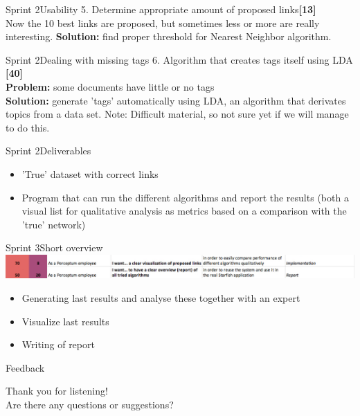 \begin{frame}{Sprint 2}{Usability}
{\large 5. Determine appropriate amount of proposed links{\bf [13]}}\\
Now the 10 best links are proposed, but sometimes less or more are really interesting.\newline \newline
{\bf Solution:} find proper threshold for Nearest Neighbor algorithm. 
\end{frame}

\begin{frame}{Sprint 2}{Dealing with missing tags}
{\large 6. Algorithm that creates tags itself using LDA {\bf[40]}}\\
{\bf Problem:} some documents have little or no tags\\
{\bf Solution:} generate 'tags' automatically using LDA, an algorithm that derivates topics from a data set.\newline \newline
Note: Difficult material, so not sure yet if we will manage to do this. 
\end{frame}

\begin{frame}{Sprint 2}{Deliverables}
\begin{itemize}
\item 'True' dataset with correct links
\item Program that can run the different algorithms and report the results (both a visual list for qualitative analysis as metrics based on a comparison with the 'true' network)
\end{itemize}
\end{frame}

\begin{frame}{Sprint 3}{Short overview}
\includegraphics[width=\linewidth]{sprint2.jpg}
\begin{itemize}
\item Generating last results and analyse these together with an expert
\item Visualize last results
\item Writing of report
\end{itemize}

\end{frame}

\begin{frame}{Feedback}

{\large Thank you for listening!}\\
Are there any questions or suggestions?
\end{frame}
